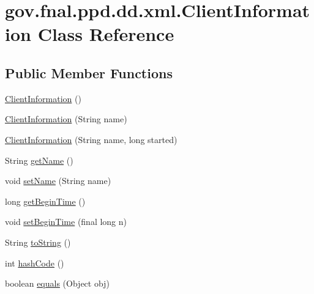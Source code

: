 \hypertarget{classgov_1_1fnal_1_1ppd_1_1dd_1_1xml_1_1ClientInformation}{\section{gov.\-fnal.\-ppd.\-dd.\-xml.\-Client\-Information Class Reference}
\label{classgov_1_1fnal_1_1ppd_1_1dd_1_1xml_1_1ClientInformation}
}
\subsection*{Public Member Functions}
\begin{DoxyCompactItemize}
\item 
\hyperlink{classgov_1_1fnal_1_1ppd_1_1dd_1_1xml_1_1ClientInformation_a67380dbcbd0547b6f7f61c235e538f3d}{Client\-Information} ()
\item 
\hyperlink{classgov_1_1fnal_1_1ppd_1_1dd_1_1xml_1_1ClientInformation_a3cc27a153d07cc68a6b6c9821787391b}{Client\-Information} (String name)
\item 
\hyperlink{classgov_1_1fnal_1_1ppd_1_1dd_1_1xml_1_1ClientInformation_a8fae44a2e648e78ce1fa7c7b41fe4ef8}{Client\-Information} (String name, long started)
\item 
String \hyperlink{classgov_1_1fnal_1_1ppd_1_1dd_1_1xml_1_1ClientInformation_a683262effad841088b2a02c3ddf0b5cc}{get\-Name} ()
\item 
void \hyperlink{classgov_1_1fnal_1_1ppd_1_1dd_1_1xml_1_1ClientInformation_a9ad5c203e1807a977409017be6f11b1b}{set\-Name} (String name)
\item 
long \hyperlink{classgov_1_1fnal_1_1ppd_1_1dd_1_1xml_1_1ClientInformation_ae65eb8030c2ec5784eb08c0bd002a4b0}{get\-Begin\-Time} ()
\item 
void \hyperlink{classgov_1_1fnal_1_1ppd_1_1dd_1_1xml_1_1ClientInformation_ae5ae113ce759b6411bbf4cf6a71b85a5}{set\-Begin\-Time} (final long n)
\item 
String \hyperlink{classgov_1_1fnal_1_1ppd_1_1dd_1_1xml_1_1ClientInformation_a744eca2ce706a119aeeba1eaac38a1f4}{to\-String} ()
\item 
int \hyperlink{classgov_1_1fnal_1_1ppd_1_1dd_1_1xml_1_1ClientInformation_aef6ae63dfc95f6e69daebab44186f066}{hash\-Code} ()
\item 
boolean \hyperlink{classgov_1_1fnal_1_1ppd_1_1dd_1_1xml_1_1ClientInformation_a00edc7badc846eb5aaf871650df1c28e}{equals} (Object obj)
\end{DoxyCompactItemize}


